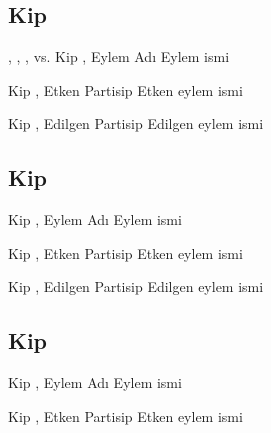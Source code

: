 \subsection*{Kip }


\begin{kip}{, , ,
    vs. \hfill Kip , Eylem Adı}
  Eylem ismi
\end{kip}

\begin{kip}{ \hfill Kip , Etken Partisip}
  Etken eylem ismi
\end{kip}

\begin{kip}{ \hfill Kip , Edilgen Partisip}
  Edilgen eylem ismi
\end{kip}



\subsection*{Kip }

\begin{kip}{ \hfill Kip , Eylem Adı}
  Eylem ismi
\end{kip}

\begin{kip}{ \hfill Kip , Etken Partisip}
  Etken eylem ismi
\end{kip}

\begin{kip}{ \hfill Kip , Edilgen Partisip}
  Edilgen eylem ismi
\end{kip}


\subsection*{Kip }

\begin{kip}{ \hfill Kip , Eylem Adı}
  Eylem ismi
\end{kip}

\begin{kip}{ \hfill Kip , Etken Partisip}
  Etken eylem ismi
\end{kip}


